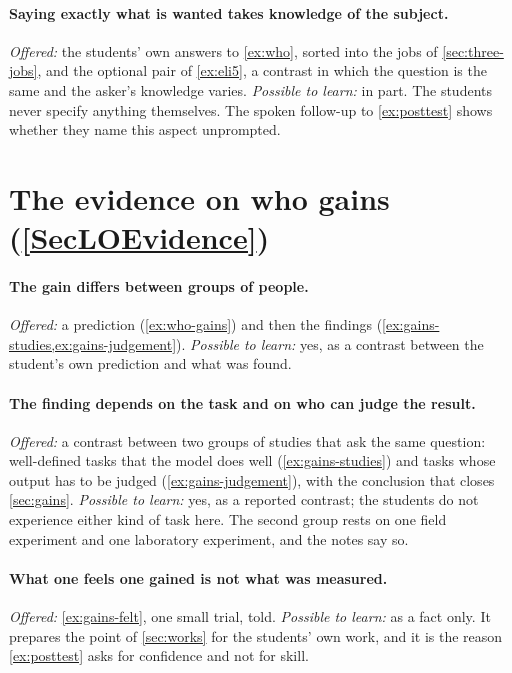 \paragraph{Saying exactly what is wanted takes knowledge of the subject.}
\emph{Offered:} the students' own answers to \cref{ex:who}, sorted
into the jobs of \cref{sec:three-jobs}, and the optional pair of
\cref{ex:eli5}, a contrast in which the question is the same and
the asker's knowledge varies.
\emph{Possible to learn:} in part.
The students never specify anything themselves.
The spoken follow-up to \cref{ex:posttest} shows whether they name
this aspect unprompted.


\section{The evidence on who gains (\cref{SecLOEvidence})}
\label{sec:design-evidence}

\SecLOEvidence*

\paragraph{The gain differs between groups of people.}
\emph{Offered:} a prediction (\cref{ex:who-gains}) and then the
findings (\cref{ex:gains-studies,ex:gains-judgement}).
\emph{Possible to learn:} yes, as a contrast between the student's own
prediction and what was found.

\paragraph{The finding depends on the task and on who can judge the
  result.}
\emph{Offered:} a contrast between two groups of studies that ask the
same question: well-defined tasks that the model does well
(\cref{ex:gains-studies}) and tasks whose output has to be judged
(\cref{ex:gains-judgement}), with the conclusion that closes
\cref{sec:gains}.
\emph{Possible to learn:} yes, as a reported contrast; the students do
not experience either kind of task here.
The second group rests on one field experiment and one laboratory
experiment, and the notes say so.

\paragraph{What one feels one gained is not what was measured.}
\emph{Offered:} \cref{ex:gains-felt}, one small trial, told.
\emph{Possible to learn:} as a fact only.
It prepares the point of \cref{sec:works} for the students' own work,
and it is the reason \cref{ex:posttest} asks for confidence and not for
skill.


